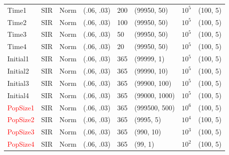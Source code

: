 \documentclass[12pt]{article}
\begin{document}
\begin{table}[]
\begin{tabular}{@{}llllllll@{}}
  Time1 & SIR &  Norm   & (.06, .03)                          &     200       &  (99950, 50)                    &  $10^5$          &(100, 5)                                \\
  Time2 & SIR &  Norm   & (.06, .03)                          &     100       &  (99950, 50)                    &  $10^5$          &(100, 5)                                \\
  Time3 & SIR &  Norm   & (.06, .03)                          &     50       &  (99950, 50)                    &  $10^5$          &(100, 5)                                \\
  Time4 & SIR &  Norm   & (.06, .03)                          &     20       &  (99950, 50)                    &  $10^5$          &(100, 5)                                \\ \midrule
  Initial1    & SIR      &   Norm             & (.06, .03)                          &     365       &  (99999, 1)                    &  $10^5$          &(100, 5)                                \\
  Initial2    & SIR      &   Norm             & (.06, .03)                          &     365       &  (99990, 10)                    &  $10^5$          &(100, 5)                                \\
  Initial3    & SIR      &   Norm             & (.06, .03)                          &     365       &  (99900, 100)                    &  $10^5$          &(100, 5)                                \\
  Initial4    & SIR      &   Norm             & (.06, .03)                          &     365       &  (99000, 1000)                    &  $10^5$          &(100, 5)                                \\ \midrule
  \textcolor{red}{PopSize1}        & SIR      &   Norm             & (.06, .03)                          &     365       &  (999500, 500)                    &  $10^6$          &(100, 5)                                \\
  \textcolor{red}{PopSize2}       & SIR      &   Norm             & (.06, .03)                          &     365       &  (9995, 5)                    &  $10^4$          &(100, 5)                                \\
  \textcolor{red}{PopSize3}        & SIR      &   Norm             & (.06, .03)                          &     365       &  (990, 10)                    &  $10^3$          &(100, 5)                                \\
  \textcolor{red}{PopSize4}        & SIR      &   Norm             & (.06, .03)                          &     365       &  (99, 1)                    &  $10^2$          &(100, 5)                                \\

\end{tabular}
\end{table}
\end{document}

